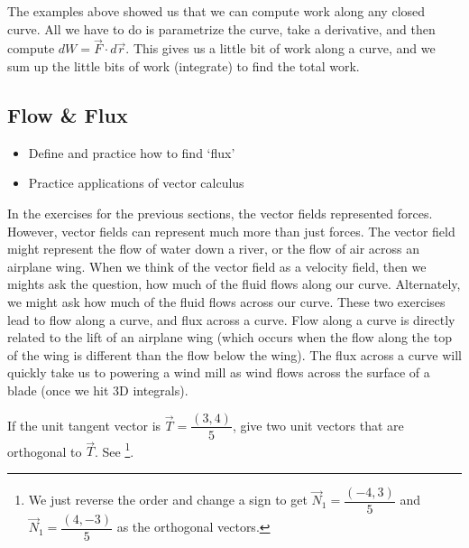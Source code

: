 The examples above showed us that we can compute work along any closed curve.  All we have to do is parametrize the curve, take a derivative, and then compute $dW = \vec F \cdot d\vec r$. This gives us a little bit of work along a curve, and we sum up the little bits of work (integrate) to find the total work. 


\subsection{Flow \& Flux}
\begin{itemize}
\item Define and practice how to find `flux'
\item Practice applications of vector calculus
\end{itemize}

In the exercises for the previous sections, the vector fields represented forces. However, vector fields can represent much more than just forces. The vector field might represent the flow of water down a river, or the flow of air across an airplane wing.  When we think of the vector field as a velocity field, then we mights ask the question, how much of the fluid flows along our curve. Alternately, we might ask how much of the fluid flows across our curve.  These two exercises lead to flow along a curve, and flux across a curve. Flow along a curve is directly related to the lift of an airplane wing (which occurs when the flow along the top of the wing is different than the flow below the wing).  The flux across a curve will quickly take us to powering a wind mill as wind flows across the surface of a blade (once we hit 3D integrals).


\begin{review*}
 If the unit tangent vector is $\vec T = \dfrac{(3,4)}{5}$, give two unit vectors that are orthogonal to $\vec T$. See \footnote{We just reverse the order and change a sign to get $\vec N_1 = \dfrac{(-4,3)}{5}$ and $\vec N_1 = \dfrac{(4,-3)}{5}$ as the orthogonal vectors.}.  
\end{review*}


